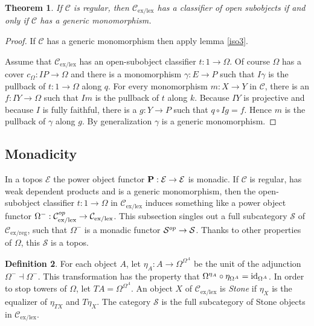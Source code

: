 \documentclass[sort&compress]{elsarticle}
\theoremstyle{plain}
\newtheorem{theorem}{Theorem}
\theoremstyle{definition}
\newtheorem{defin}[theorem]{Definition}
\theoremstyle{remark}
\newcommand\hide[1]{}
\newcommand\cat\mathcal
\newcommand\exlex{_\mathrm{ex/lex}}
\newcommand\exreg{_\mathrm{ex/reg}}
\begin{document}
\begin{theorem} If $\cat C$ is regular, then $\cat C\exlex$ has a classifier of open subobjects if and only if $\cat C$ has a generic monomorphism. \label{closubclass}\end{theorem}

\begin{proof} If $\cat C$ has a generic monomorphism then apply lemma \ref{iso3}.

Assume that $\cat C\exlex$ has an open-subobject classifier $t:1\to \Omega$. Of course $\Omega$ has a cover $c_\Omega:IP\to \Omega$ and there is a monomorphism $\gamma:E\to P$ such that $I\gamma$ is the pullback of $t:1\to \Omega$ along $q$. For every monomorphism $m:X\to Y$ in $\cat C$, there is an $f:IY \to \Omega$ such that $Im$ is the pullback of $t$ along $k$. Because $IY$ is projective and because $I$ is fully faithful, there is a $g:Y \to P$ such that $q\circ Ig = f$. Hence $m$ is the pullback of $\gamma$ along $g$. By generalization $\gamma$ is a generic monomorphism.
\end{proof}

\subsection{Monadicity}
In a topos $\cat E$ the power object functor $\pow:\cat E\to \cat E$ is monadic. If $\cat C$ is regular, has weak dependent products and is a generic monomorphism, then the open-subobject classifier $t:1\to\Omega$ in $\cat C\exlex$ induces something like a power object functor $\Omega^-: \cat C\exlex\dual \to \cat C\exlex$. This subsection singles out a full subcategory $\cat S$ of $\cat C\exreg$, such that $\Omega^-$ is a monadic functor $\cat S\dual \to\cat S$. Thanks to other properties of $\Omega$, this $\cat S$ is a topos.

\hide{Een voorbeeld van een reguliere cat met zwakke afhankelijke producten en een generiek monomorfisme die geen sterke producten heeft. Dit lijkt me lastiger.

Moeten we daar hier nog even naar verwijzen?
}

\newcommand\clopow{\Omega^}
\newcommand\unit{\eta_}
\begin{defin} For each object $A$, let $\unit A:A\to \clopow{\clopow A}$ be the unit of the adjunction $\clopow- \dashv \clopow-$. This transformation has the property that $\clopow{\unit A}\circ \unit{\clopow A} = \id_{\clopow A}$. In order to stop towers of $\Omega$, let $TA = \clopow{\clopow A}$.
An object $X$ of $\cat C\exlex$ is \emph{Stone} if $\unit X$ is the equalizer of $\unit{TX}$ and $T\unit X$. The category $\cat S$ is the full subcategory of Stone objects in $\cat C\exlex$.
\end{defin}
\end{document}
